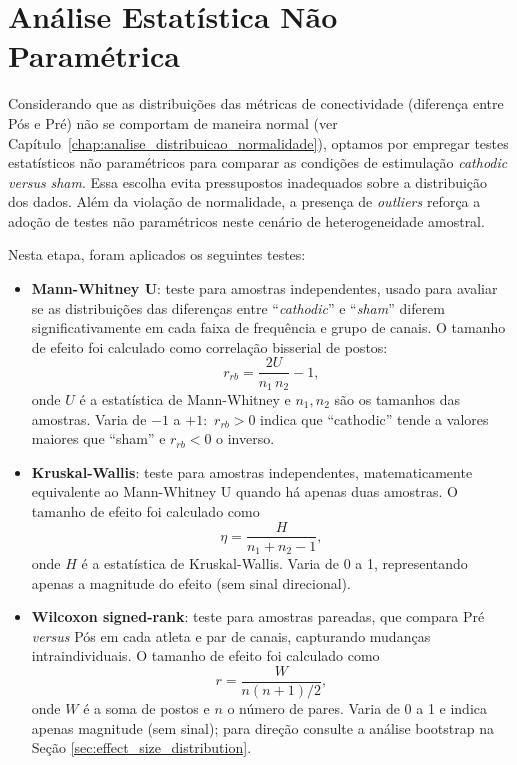 \chapter{Análise Estatística Não Paramétrica}
\label{chap:analise_estatistica_np}
Considerando que as distribuições das métricas de conectividade (diferença entre Pós e Pré) não se comportam de maneira normal (ver Capítulo~\ref{chap:analise_distribuicao_normalidade}), optamos por empregar testes estatísticos não paramétricos para comparar as condições de estimulação \textit{cathodic} \textit{versus} \textit{sham}. Essa escolha evita pressupostos inadequados sobre a distribuição dos dados. Além da violação de normalidade, a presença de \textit{outliers} reforça a adoção de testes não paramétricos neste cenário de heterogeneidade amostral.

Nesta etapa, foram aplicados os seguintes testes:
\begin{itemize}
    \item \textbf{Mann-Whitney U}: teste para amostras independentes, usado para avaliar se as distribuições das diferenças entre ``\textit{cathodic}'' e ``\textit{sham}'' diferem significativamente em cada faixa de frequência e grupo de canais.  
      O tamanho de efeito foi calculado como correlação bisserial de postos:
      \[
        r_{rb} = \frac{2U}{n_1\,n_2} - 1,
      \]
      onde \(U\) é a estatística de Mann-Whitney e \(n_1,n_2\) são os tamanhos das amostras. Varia de \(-1\) a \(+1\):  
      \(\,r_{rb}>0\) indica que ``cathodic'' tende a valores maiores que ``sham'' e \(r_{rb}<0\) o inverso.
      
    \item \textbf{Kruskal-Wallis}: teste para amostras independentes, matematicamente equivalente ao Mann-Whitney U quando há apenas duas amostras.  
      O tamanho de efeito foi calculado como
      \[
        \eta = \frac{H}{n_1 + n_2 - 1},
      \]
      onde \(H\) é a estatística de Kruskal-Wallis. Varia de 0 a 1, representando apenas a magnitude do efeito (sem sinal direcional).
      
    \item \textbf{Wilcoxon signed-rank}: teste para amostras pareadas, que compara Pré \textit{versus} Pós em cada atleta e par de canais, capturando mudanças intraindividuais. O tamanho de efeito foi calculado como
      \[
        r = \frac{W}{n(n+1)/2},
      \]
      onde \(W\) é a soma de postos e \(n\) o número de pares. Varia de 0 a 1 e indica apenas magnitude (sem sinal); para direção consulte a análise bootstrap na Seção \ref{sec:effect_size_distribution}.
  \end{itemize}

